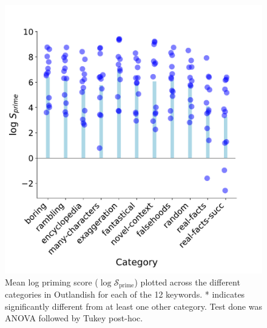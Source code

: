 \documentclass[11pt, a4paper, logo, copyright]{googledeepmind}
\theoremstyle{plain}
\theoremstyle{definition}
\theoremstyle{remark}
\begin{document}
\begin{figure}[h]
\vspace{0mm}
  \begin{minipage}[c]{0.55\textwidth}
    \centering \includegraphics[scale=.4,clip]{figures/categories.pdf}
  \end{minipage}\hfill
  \begin{minipage}[c]{0.35\textwidth}
    \vspace{-1mm}
    \caption{Mean log priming score ($\log \mathcal{S}_\text{prime}$) plotted across the different categories in Outlandish for each of the 12 keywords. * indicates significantly different from at least one other category. Test done was ANOVA followed by Tukey post-hoc.} \label{fig:categories}
  \end{minipage}
  \vspace{-0mm}
\end{figure}
\end{document}
